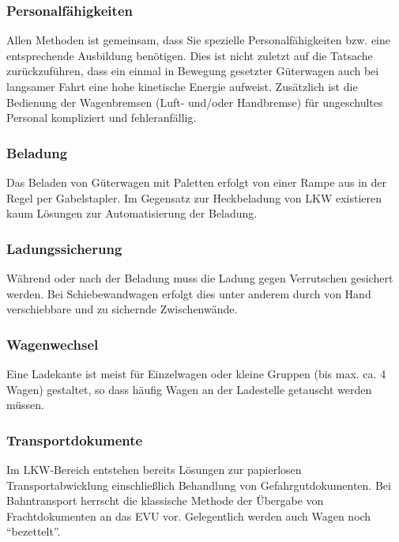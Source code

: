 \subsubsection{Personalfähigkeiten}
Allen Methoden ist gemeinsam, dass Sie spezielle Personalfähigkeiten bzw. eine entsprechende Ausbildung benötigen. Dies ist nicht zuletzt auf die Tatsache zurückzuführen, dass ein einmal in Bewegung gesetzter Güterwagen auch bei langsamer Fahrt eine hohe kinetische Energie aufweist. Zusätzlich ist die Bedienung der Wagenbremsen (Luft- und/oder Handbremse) für ungeschultes Personal kompliziert und fehleranfällig.
\subsubsection{Beladung}
Das Beladen von Güterwagen mit Paletten erfolgt von einer Rampe aus in der Regel per Gabelstapler. Im Gegensatz zur Heckbeladung von LKW existieren kaum Lösungen zur Automatisierung der Beladung. 
\subsubsection{Ladungssicherung}
Während oder nach der Beladung muss die Ladung gegen Verrutschen gesichert werden. Bei Schiebewandwagen erfolgt dies unter anderem durch von Hand verschiebbare und zu sichernde Zwischenwände.
\subsubsection{Wagenwechsel}
Eine Ladekante ist meist für Einzelwagen oder kleine Gruppen (bis max. ca. 4 Wagen) gestaltet, so dass häufig Wagen an der Ladestelle getauscht werden müssen. %
\subsubsection{Transportdokumente}
Im LKW-Bereich entstehen bereits Lösungen zur papierlosen Transportabwicklung einschließlich Behandlung von Gefahrgutdokumenten. Bei Bahntransport herrscht die klassische Methode der Übergabe von Frachtdokumenten an das EVU vor. Gelegentlich werden auch Wagen noch "`bezettelt"'. %

